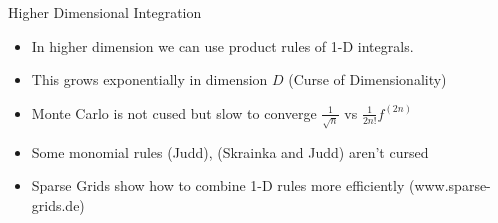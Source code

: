 \documentclass[xcolor=pdftex,dvipsnames,table,mathserif,aspectratio=169]{beamer}
\begin{document}
\begin{frame}{Higher Dimensional Integration}
\begin{itemize}
\item In higher dimension we can use product rules of 1-D integrals.
\item This grows exponentially in dimension $D$ (Curse of Dimensionality)
\item Monte Carlo is not cused but slow to converge $\frac{1}{\sqrt{n}}$ vs $\frac{1}{2n!} f^{(2n)}$
\item Some monomial rules (Judd), (Skrainka and Judd) aren't cursed
\item Sparse Grids show how to combine 1-D rules more efficiently (www.sparse-grids.de)
\end{itemize}
\end{frame}
\end{document}
